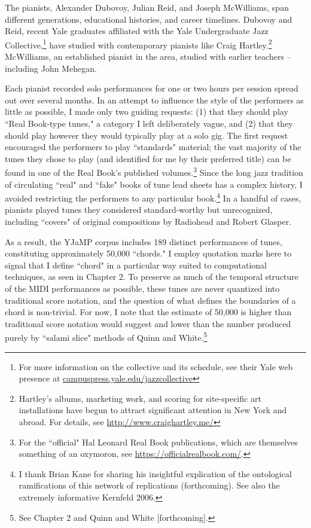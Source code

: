 The pianists, Alexander Dubovoy, Julian Reid, and Joseph McWilliams, span different generations, educational histories, and career timelines.  Dubovoy and Reid, recent Yale graduates affiliated with the Yale Undergraduate Jazz Collective,\footnote{For more information on the collective and its schedule, see their Yale web presence at \href{http://campuspress.yale.edu/jazzcollective/}{campuspress.yale.edu/jazzcollective}} have studied with contemporary pianists like Craig Hartley.\footnote{Hartley's albums, marketing work, and scoring for site-specific art installations have begun to attract significant attention in New York and abroad.  For details, see \href{http://www.craighartley.me/}{http://www.craighartley.me/}}  McWilliams, an established pianist in the area, studied with earlier teachers -- including John Mehegan.

Each pianist recorded solo performances for one or two hours per session spread out over several months.  In an attempt to influence the style of the performers as little as possible, I made only two guiding requests: (1) that they should play ``Real Book-type tunes," a category I left deliberately vague, and (2) that they should play however they would typically play at a solo gig.  The first request encouraged the performers to play ``standards" material; the vast majority of the tunes they chose to play (and identified for me by their preferred title) can be found in one of the Real Book's published volumes.\footnote{For the ``official" Hal Leonard Real Book publications, which are themselves something of an oxymoron, see \href{https://officialrealbook.com/}{https://officialrealbook.com/}.}  Since the long jazz tradition of circulating ``real" and ``fake" books of tune lead sheets has a complex history, I avoided restricting the performers to any particular book.\footnote{I thank Brian Kane for sharing his insightful explication of the ontological ramifications of this network of replications (forthcoming).  See also the extremely informative Kernfeld 2006.}  In a handful of cases, pianists played tunes they considered standard-worthy but unrecognized, including ``covers" of original compositions by Radiohead and Robert Glasper.

As a result, the YJaMP corpus includes 189 distinct performances of tunes, constituting approximately 50,000 ``chords."  I employ quotation marks here to signal that I define ``chord" in a particular way suited to computational techniques, as seen in Chapter 2.  To preserve as much of the temporal structure of the MIDI performances as possible, these tunes are never quantized into traditional score notation, and the question of what defines the boundaries of a chord is non-trivial.  For now, I note that the estimate of 50,000 is higher than traditional score notation would suggest and lower than the number produced purely by ``salami slice" methods of Quinn and White.\footnote{See Chapter 2 and Quinn and White [forthcoming].}

